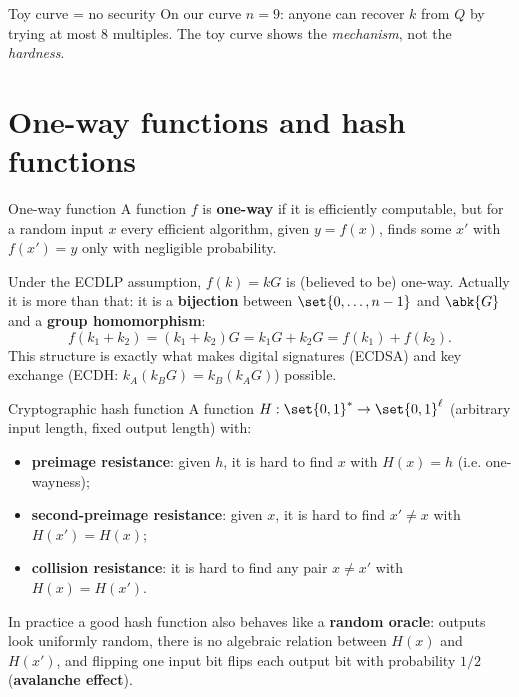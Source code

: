 \begin{framedobs}{Toy curve = no security}
  On our curve $n = 9$: anyone can recover $k$ from $Q$ by trying at most 8 multiples. The toy curve shows the \textit{mechanism}, not the \textit{hardness}.
\end{framedobs}

\section{One-way functions and hash functions}

\begin{frameddefn}[label={def:owf}]{One-way function}
  A function $f$ is \textbf{one-way} if it is efficiently computable, but for a random input $x$ every efficient algorithm, given $y = f(x)$, finds some $x'$ with $f(x') = y$ only with negligible probability.
\end{frameddefn}

Under the ECDLP assumption, $f(k) = kG$ is (believed to be) one-way. Actually it is more than that: it is a \textbf{bijection} between $\set{0, \ldots, n-1}$ and $\abk{G}$ and a \textbf{group homomorphism}:
\[
  f(k_1 + k_2) = (k_1 + k_2)G = k_1 G + k_2 G = f(k_1) + f(k_2).
\]
This structure is exactly what makes digital signatures (ECDSA) and key exchange (ECDH: $k_A(k_B G) = k_B(k_A G)$) possible.

\begin{frameddefn}[label={def:hash}]{Cryptographic hash function}
  A function $H : \set{0,1}^* \to \set{0,1}^\ell$ (arbitrary input length, fixed output length) with:
  \begin{itemize}
    \item \textbf{preimage resistance}: given $h$, it is hard to find $x$ with $H(x) = h$ (i.e. one-wayness);
    \item \textbf{second-preimage resistance}: given $x$, it is hard to find $x' \neq x$ with $H(x') = H(x)$;
    \item \textbf{collision resistance}: it is hard to find any pair $x \neq x'$ with $H(x) = H(x')$.
  \end{itemize}
  In practice a good hash function also behaves like a \textbf{random oracle}: outputs look uniformly random, there is no algebraic relation between $H(x)$ and $H(x')$, and flipping one input bit flips each output bit with probability $1/2$ (\textbf{avalanche effect}).
\end{frameddefn}

